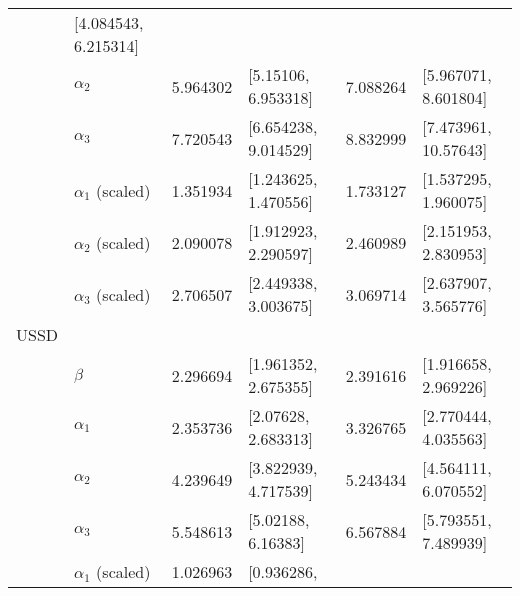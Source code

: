 \documentclass[12pt,letterpaper,leqno]{article}\usepackage[]{graphicx}\usepackage[]{color}
\begin{document}
\begin{table}[!h]
\begin{tabular}{p{.5cm}p{2cm}p{1.5cm}p{4cm}p{1.5cm}p{4cm}}
                         & [4.084543, 
                         6.215314]\\
 & $\alpha_{2}$          & 5.964302 
                         & [5.15106, 
                         6.953318]
                         & 7.088264 
                         & [5.967071, 
                         8.601804]\\
 & $\alpha_{3}$          & 7.720543 
                         & [6.654238, 
                         9.014529]
                         & 8.832999 
                         & [7.473961, 
                         10.57643]\\
 & $\alpha_{1}$ (scaled) & 1.351934 
                         & [1.243625, 
                         1.470556]
                         & 1.733127 
                         & [1.537295, 
                         1.960075]\\
 & $\alpha_{2}$ (scaled) & 2.090078 
                         & [1.912923, 
                         2.290597]
                         & 2.460989 
                         & [2.151953, 
                         2.830953]\\
 & $\alpha_{3}$ (scaled) & 2.706507 
                         & [2.449338, 
                         3.003675]
                         & 3.069714 
                         & [2.637907, 
                         3.565776]\\
USSD & & & & & \\ 
 & $\beta$               & 2.296694 
                         & [1.961352, 
                         2.675355] 
                         & 2.391616 
                         & [1.916658, 
                         2.969226]\\
 & $\alpha_{1}$          & 2.353736 
                         & [2.07628, 
                         2.683313]
                         & 3.326765 
                         & [2.770444, 
                         4.035563]\\
 & $\alpha_{2}$          & 4.239649 
                         & [3.822939, 
                         4.717539]
                         & 5.243434 
                         & [4.564111, 
                         6.070552]\\
 & $\alpha_{3}$          & 5.548613 
                         & [5.02188, 
                         6.16383]
                         & 6.567884 
                         & [5.793551, 
                         7.489939]\\
 & $\alpha_{1}$ (scaled) & 1.026963 
                         & [0.936286, 

\end{tabular}
\end{table}
\end{document}
